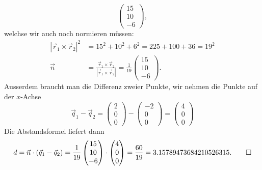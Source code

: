 \begin{loesung}
\[\begin{pmatrix}
15\\10\\ -6
\end{pmatrix},
\]
welchse wir auch noch normieren müssen:
\begin{align*}
|\vec r_1\times\vec r_2|^2
&=15^2+10^2+6^2=225+100+36=19^2
\\
\vec n&=
\frac{\vec r_1\times\vec r_2}{|\vec r_1\times\vec r_2|}=
\frac1{19}
\begin{pmatrix}
15\\10\\ -6
\end{pmatrix}.
\end{align*}
Ausserdem braucht man die Differenz zweier Punkte,
wir nehmen die Punkte auf der $x$-Achse
\[
\vec q_1-\vec q_2
=
\begin{pmatrix}2\\0\\0\end{pmatrix}
-
\begin{pmatrix}-2\\0\\0\end{pmatrix}
=
\begin{pmatrix}4\\0\\0\end{pmatrix}
\]
Die Abstandsformel liefert dann
\[
d=\vec n\cdot (\vec q_1-\vec q_2)=
\frac1{19}
\begin{pmatrix}
15\\10\\ -6
\end{pmatrix}
\cdot
\begin{pmatrix}4\\0\\0\end{pmatrix}
=\frac{60}{19}
=
3.15789473684210526315.
\qedhere
\]
\end{loesung}

